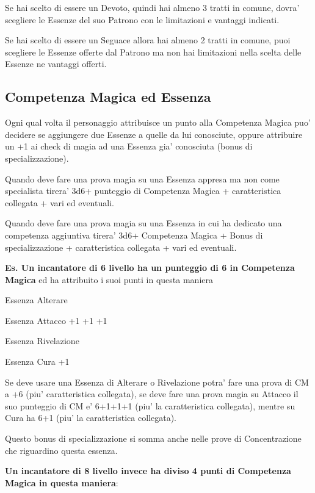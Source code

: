 \documentclass[a4paper,11pt,twoside,openany]{book}
\begin{document}
Se hai scelto di essere un Devoto, quindi hai almeno 3 tratti in comune, dovra' scegliere le Essenze del suo Patrono con le limitazioni e vantaggi indicati.

Se hai scelto di essere un Seguace allora hai almeno 2 tratti in comune, puoi scegliere le Essenze offerte dal Patrono ma non hai limitazioni nella scelta delle Essenze ne vantaggi offerti.

\subsection{Competenza Magica ed Essenza}

\label{competenza-magica-ed-essenza}

Ogni qual volta il personaggio attribuisce un punto alla Competenza Magica puo' decidere se aggiungere due Essenze a quelle da lui conosciute, oppure attribuire un +1 ai check di magia ad una Essenza gia' conosciuta (bonus di specializzazione).

Quando deve fare una prova magia su una Essenza appresa ma non come specialista tirera' 3d6+ punteggio di Competenza Magica + caratteristica collegata + vari ed eventuali.

Quando deve fare una prova magia su una Essenza in cui ha dedicato una competenza aggiuntiva tirera' 3d6+ Competenza Magica + Bonus di specializzazione + caratteristica collegata + vari ed eventuali.

\bigskip

\textbf{Es. Un incantatore di 6 livello ha un punteggio di 6 in Competenza Magica} ed ha attribuito i suoi punti in questa maniera

Essenza Alterare

Essenza Attacco +1 +1 +1

Essenza Rivelazione

Essenza Cura +1

Se deve usare una Essenza di Alterare o Rivelazione potra' fare una prova di CM a +6 (piu' caratteristica collegata), se deve fare una prova magia su Attacco il suo punteggio di CM e' 6+1+1+1 (piu' la caratteristica collegata), mentre su Cura ha 6+1 (piu' la caratteristica collegata).

Questo bonus di specializzazione si somma anche nelle prove di Concentrazione che riguardino questa essenza.

\bigskip

\textbf{Un incantatore di 8 livello invece ha diviso 4 punti di Competenza
Magica in questa maniera}:
\end{document}
